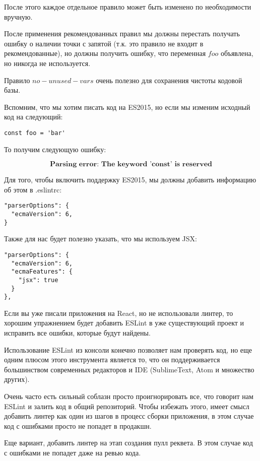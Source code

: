 После этого каждое отдельное правило может быть изменено по необходимости вручную.

После применения рекомендованных правил мы должны перестать получать ошибку о наличии точки с запятой (т.к. это правило не входит в рекомендованные), но должны получить ошибку, что переменная $foo$ объявлена, но никогда не используется.

Правило $no-unused-vars$ очень полезно для сохранения чистоты кодовой базы.

Вспомним, что мы хотим писать код на ES2015, но если мы изменим исходный код на следующий:

\begin{lstlisting}
const foo = 'bar'
\end{lstlisting}

То получим следующую ошибку:

$$
\textbf{Parsing error: The keyword 'const' is reserved}
$$

Для того, чтобы включить поддержку ES2015, мы должны добавить информацию об этом в .eslintrc:

\begin{lstlisting}
"parserOptions": {
  "ecmaVersion": 6,
}
\end{lstlisting}

Также для нас будет полезно указать, что мы используем JSX:

\begin{lstlisting}
"parserOptions": {
  "ecmaVersion": 6,
  "ecmaFeatures": {
    "jsx": true 
  }
},
\end{lstlisting}

Если вы уже писали приложения на React, но не использовали линтер, то хорошим упражнением будет добавить ESLint в уже существующий проект и исправить все ошибки, которые будут найдены.

Использование ESLint из консоли конечно позволяет нам проверять код, но еще одним плюсом этого инструмента является то, что он поддерживается большинством современных редакторов и IDE (SublimeText, Atom и множество других).

Очень часто есть сильный соблазн просто проигнорировать все, что говорит нам ESLint и залить код в общий репозиторий. Чтобы избежать этого, имеет смысл добавить линтер как один из шагов в процесс сборки приложения, в этом случае код с ошибками просто не попадет в продакшн.

Еще вариант, добавить линтер на этап создания пулл реквета. В этом случае код с ошибками не попадет даже на ревью кода.

